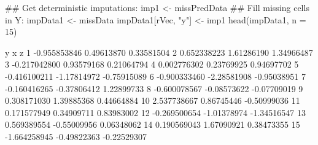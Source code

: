 \begin{Schunk}
\begin{Sinput}
 ## Get deterministic imputations:
 imp1 <- missPredData %*% betaHat
 ## Fill missing cells in Y:
 impData1 <- missData
 impData1[rVec, "y"] <- imp1
 head(impData1, n = 15)
\end{Sinput}
\begin{Soutput}
              y           x           z
1  -0.955853846  0.49613870  0.33581504
2   0.652338223  1.61286190  1.34966487
3  -0.217042800  0.93579168  0.21064794
4   0.002776302  0.23769925  0.94697702
5  -0.416100211 -1.17814972 -0.75915089
6  -0.900333460 -2.28581908 -0.95038951
7  -0.160416265 -0.37806412  1.22899733
8  -0.600078567 -0.08573622 -0.07709019
9   0.308171030  1.39885368  0.44664884
10  2.537738667  0.86745446 -0.50999036
11  0.171577949  0.34909711  0.83983002
12 -0.269500654 -1.01378974 -1.34516547
13  0.569389554 -0.55009956  0.06348062
14  0.190569043  1.67090921  0.38473355
15 -1.664258945 -0.49822363 -0.22529307
\end{Soutput}
\end{Schunk}
